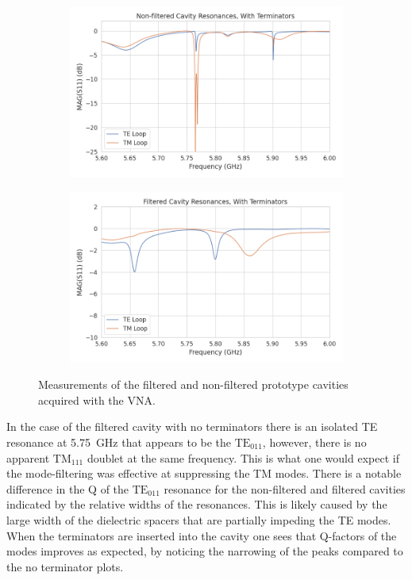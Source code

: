 \begin{figure}[htbp]
    \hfill
    \begin{subfigure}{0.48\textwidth}
        \includegraphics*[width=\textwidth]{figs/Chapter-6/230613_TETM_nofilter_cav_with_term.png}
        \caption{}
    \end{subfigure}
    \hfill
    \begin{subfigure}{0.48\textwidth}
        \includegraphics*[width=\textwidth]{figs/Chapter-6/230613_TETM_filter_cav_with_term.png}
        \caption{}
    \end{subfigure}
    \caption{\label{fig:chap6-cav-measurements-no-term} Measurements of the filtered and non-filtered prototype cavities acquired with the VNA.}
\end{figure}
In the case of the filtered cavity with no terminators there is an isolated TE resonance at 5.75~GHz that appears to be the $\mathrm{TE}_{011}$, however, there is no apparent $\mathrm{TM}_{111}$ doublet at the same frequency. This is what one would expect if the mode-filtering was effective at suppressing the TM modes. There is a notable difference in the Q of the $\mathrm{TE}_{011}$ resonance for the non-filtered and filtered cavities indicated by the relative widths of the resonances. This is likely caused by the large width of the dielectric spacers that are partially impeding the TE modes. When the terminators are inserted into the cavity one sees that Q-factors of the modes improves as expected, by noticing the narrowing of the peaks compared to the no terminator plots. 

